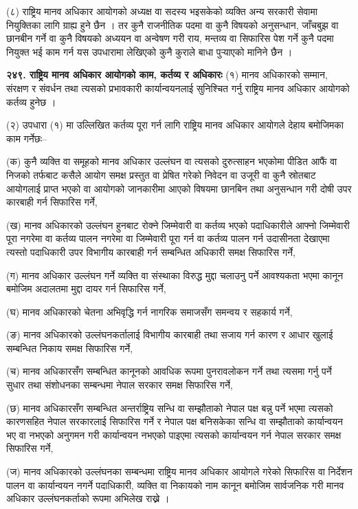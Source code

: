 (८) राष्ट्रिय मानव अधिकार आयोगको अध्यक्ष वा सदस्य भइसकेको व्यक्ति अन्य सरकारी सेवामा नियुक्तिका लागि ग्राह्य हुने छैन ।
तर कुनै राजनीतिक पदमा वा कुनै विषयको अनुसन्धान, जाँचबुझ वा छानबीन गर्ने वा कुनै विषयको अध्ययन वा अन्वेषण गरी राय, मन्तव्य वा सिफारिस पेश गर्ने कुनै पदमा नियुक्त भई काम गर्न यस उपधारामा लेखिएको कुनै कुराले बाधा पुर्‍याएको मानिने छैन ।

\textbf{२४९. राष्ट्रिय मानव अधिकार आयोगको काम, कर्तव्य र अधिकारः} (१) मानव अधिकारको सम्मान, संरक्षण र संवर्धन तथा त्यसको प्रभावकारी कार्यान्वयनलाई सुनिश्चित गर्नु राष्ट्रिय मानव अधिकार आयोगको कर्तव्य हुनेछ ।

(२) उपधारा (१) मा उल्लिखित कर्तव्य पूरा गर्न लागि राष्ट्रिय मानव अधिकार आयोगले देहाय बमोजिमका काम गर्नेछः–

(क) कुनै व्यक्ति वा समूहको मानव अधिकार उल्लंघन वा त्यसको दुरुत्साहन भएकोमा पीडित आफैं वा निजको तर्फबाट कसैले
आयोग समक्ष प्रस्तुत वा प्रेषित गरेको निवेदन वा उजूरी वा कुनै स्रोतबाट आयोगलाई प्राप्त भएको वा आयोगको जानकारीमा आएको विषयमा छानबिन तथा अनुसन्धान गरी दोषी उपर कारबाही गर्न सिफारिस गर्ने,

(ख) मानव अधिकारको उल्लंघन हुनबाट रोक्ने जिम्मेवारी वा कर्तव्य भएको पदाधिकारीले आफ्नो जिम्मेवारी पूरा नगरेमा वा कर्तव्य पालन नगरेमा वा जिम्मेवारी पूरा गर्न वा कर्तव्य पालन गर्न उदासीनता देखाएमा त्यस्तो पदाधिकारी उपर विभागीय कारबाही गर्न सम्बन्धित अधिकारी समक्ष सिफारिस गर्ने,

(ग) मानव अधिकार उल्लंघन गर्ने व्यक्ति वा संस्थाका विरुद्ध मुद्दा चलाउनु पर्ने आवश्यकता भएमा कानून बमोजिम अदालतमा मुद्दा दायर गर्न सिफारिस गर्ने,

(घ) मानव अधिकारको चेतना अभिवृद्धि गर्न नागरिक समाजसँग समन्वय र सहकार्य गर्ने,

(ङ) मानव अधिकारको उल्लंघनकर्तालाई विभागीय कारबाही तथा सजाय गर्न कारण र आधार खुलाई सम्बन्धित निकाय समक्ष
सिफारिस गर्ने,

(च) मानव अधिकारसँग सम्बन्धित कानूनको आवधिक रूपमा पुनरावलोकन गर्ने तथा त्यसमा गर्नु पर्ने सुधार तथा संशोधनका सम्बन्धमा नेपाल सरकार समक्ष सिफारिस गर्ने,

(छ) मानव अधिकारसँग सम्बन्धित अन्तर्राष्ट्रिय सन्धि वा सम्झौताको नेपाल पक्ष बन्नु पर्ने भएमा त्यसको कारणसहित नेपाल सरकारलाई सिफारिस गर्ने र नेपाल पक्ष बनिसकेका सन्धि वा सम्झौताको कार्यान्वयन भए वा नभएको अनुगमन गरी कार्यान्वयन नभएको पाइएमा त्यसको कार्यान्वयन गर्न नेपाल सरकार समक्ष सिफारिस गर्ने,

(ज) मानव अधिकारको उल्लंघनका सम्बन्धमा राष्ट्रिय मानव अधिकार आयोगले गरेको सिफारिस वा निर्देशन पालन वा कार्यान्वयन नगर्ने पदाधिकारी, व्यक्ति वा निकायको नाम कानून बमोजिम सार्वजनिक गरी मानव अधिकार उल्लंघनकर्ताको रूपमा अभिलेख राख्ने ।


